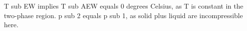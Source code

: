 T sub EW implies T sub AEW equals 0 degrees Celsius, as T is constant in the two-phase region.  
p sub 2 equals p sub 1, as solid plus liquid are incompressible here.